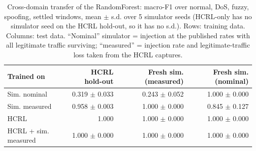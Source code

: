 \begin{table}[t]
\centering
\footnotesize
\caption{Cross-domain transfer of the RandomForest: macro-F1 over {normal, DoS, fuzzy, spoofing}, settled windows, mean $\pm$ s.d. over 5 simulator seeds (HCRL-only has no simulator seed on the HCRL hold-out, so it has no s.d.). Rows: training data. Columns: test data. ``Nominal'' simulator = injection at the published rates with all legitimate traffic surviving; ``measured'' = injection rate and legitimate-traffic loss taken from the HCRL captures.}
\label{tab:hcrl_transfer_settled}
\begin{tabular}{lrrr}
\toprule
Trained on & HCRL hold-out & Fresh sim. (measured) & Fresh sim. (nominal) \\
\midrule
Sim. nominal & 0.319 $\pm$ 0.033 & 0.243 $\pm$ 0.052 & 1.000 $\pm$ 0.000 \\
Sim. measured & 0.958 $\pm$ 0.003 & 1.000 $\pm$ 0.000 & 0.845 $\pm$ 0.127 \\
HCRL & 1.000 & 1.000 $\pm$ 0.000 & 1.000 $\pm$ 0.000 \\
HCRL + sim. measured & 1.000 $\pm$ 0.000 & 1.000 $\pm$ 0.000 & 1.000 $\pm$ 0.000 \\
\bottomrule
\end{tabular}
\end{table}
